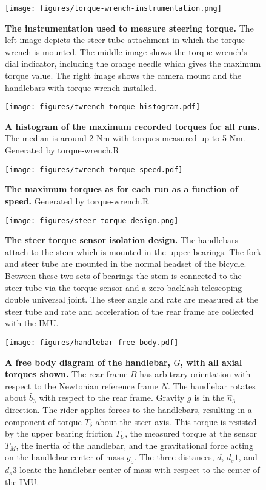 \documentclass[10pt]{article}
\begin{document}
\begin{figure}[!ht]
  \centering
  \texttt{[image: figures/torque-wrench-instrumentation.png]}
  \caption{{\bf The instrumentation used to measure steering torque.}
    The left image depicts the steer tube attachment in which the torque wrench
    is mounted. The middle image shows the torque wrench's dial indicator,
    including the orange needle which gives the maximum torque value. The right
    image shows the camera mount and the handlebars with torque wrench
    installed.
    }
  \label{fig:torque-wrench-instrumentation}
\end{figure}

\begin{figure}[!ht]
  \centering
  \texttt{[image: figures/twrench-torque-histogram.pdf]}
  \caption{{\bf A histogram of the maximum recorded torques for all runs.}
    The median is around 2 Nm with torques measured up to 5 Nm. Generated by
    torque-wrench.R}
  \label{fig:twrench-torque-histogram}
\end{figure}

\begin{figure}[!ht]
  \centering
  \texttt{[image: figures/twrench-torque-speed.pdf]}
  \caption{{\bf The maximum torques as for each run as a function of speed.}
    Generated by torque-wrench.R}
  \label{fig:twrench-torque-speed}
\end{figure}

\begin{figure}[!ht]
  \centering
  \texttt{[image: figures/steer-torque-design.png]}
  \caption{{\bf The steer torque sensor isolation design.} The handlebars attach to
    the stem which is mounted in the upper bearings. The fork and steer tube
    are mounted in the normal headset of the bicycle. Between these two sets of
    bearings the stem is connected to the steer tube via the torque sensor and a
    zero backlash telescoping double universal joint. The steer angle and rate
    are measured at the steer tube and rate and acceleration of the rear frame
    are collected with the IMU.}
  \label{fig:steer-torque-design}
\end{figure}

\begin{figure}[!ht]
  \centering
  \texttt{[image: figures/handlebar-free-body.pdf]}
  \caption{{\bf A free body diagram of the handlebar, $G$, with all axial torques
    shown.} The rear frame $B$ has arbitrary orientation with respect to the
    Newtonian reference frame $N$. The handlebar rotates about $\hat{b}_3$ with
    respect to the rear frame. Gravity $g$ is in the $\hat{n}_3$ direction. The
    rider applies forces to the handlebars, resulting in a component of torque
    $T_\delta$ about the steer axis. This torque is resisted by the upper
    bearing friction $T_U$, the measured torque at the sensor $T_M$, the
    inertia of the handlebar, and the gravitational force acting on the
    handlebar center of mass $g_o$. The three distances, $d$, $d_s1$, and
    $d_s3$ locate the handlebar center of mass with respect to the center of
    the IMU.}
  \label{fig:handlebar-free-body}
\end{figure}
\end{document}
